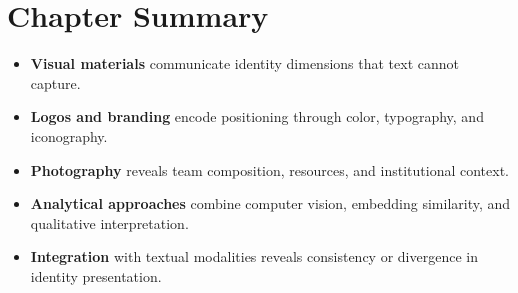 \documentclass[../main.tex]{subfiles}
\begin{document}
\section*{Chapter Summary}

\begin{summarybox}
\begin{itemize}[leftmargin=*, itemsep=0.3em]
\item \textbf{Visual materials} communicate identity dimensions that text cannot capture.

\item \textbf{Logos and branding} encode positioning through color, typography, and iconography.

\item \textbf{Photography} reveals team composition, resources, and institutional context.

\item \textbf{Analytical approaches} combine computer vision, embedding similarity, and qualitative interpretation.

\item \textbf{Integration} with textual modalities reveals consistency or divergence in identity presentation.
\end{itemize}
\end{summarybox}

\vspace{0.5cm}

\begin{center}
\end{center}

\closeintermezzo
\end{document}
